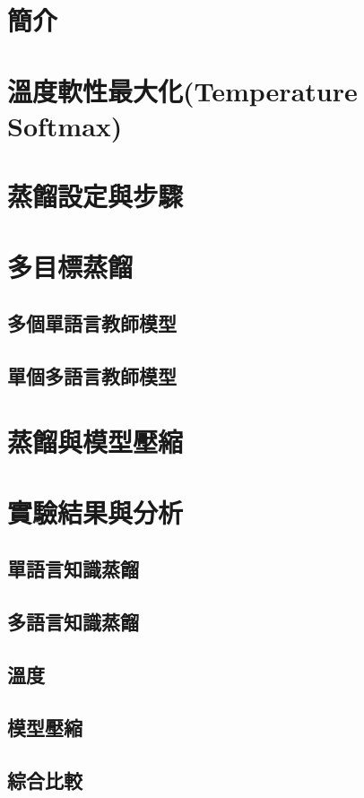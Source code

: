 \section{簡介}
\section{溫度軟性最大化(Temperature Softmax)}
\section{蒸餾設定與步驟}
\section{多目標蒸餾}
\subsection{多個單語言教師模型}
\subsection{單個多語言教師模型}
\section{蒸餾與模型壓縮}
\section{實驗結果與分析}
\subsection{單語言知識蒸餾}
\subsection{多語言知識蒸餾}
\subsection{溫度}
\subsection{模型壓縮}
\subsection{綜合比較}    

